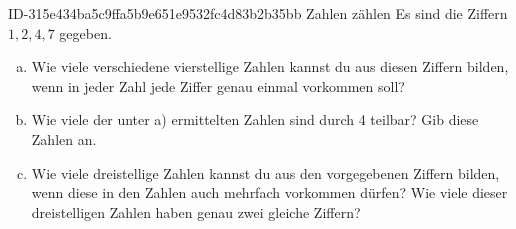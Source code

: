 \begin{exercise}
      {ID-315e434ba5c9ffa5b9e651e9532fc4d83b2b35bb}
      {Zahlen zählen}
  \ifproblem\problem
    Es sind die Ziffern $1,2,4,7$ gegeben.
    \begin{enumerate}[a)]
      \item Wie viele verschiedene vierstellige Zahlen kannst du aus diesen
            Ziffern bilden, wenn in jeder Zahl jede Ziffer genau einmal vorkommen
            soll?
      \item Wie viele der unter a) ermittelten Zahlen sind durch 4 teilbar?
            Gib diese Zahlen an.
      \item Wie viele dreistellige Zahlen kannst du aus den vorgegebenen Ziffern
            bilden, wenn diese in den Zahlen auch mehrfach vorkommen dürfen? Wie
            viele dieser dreistelligen Zahlen haben genau zwei gleiche Ziffern?
    \end{enumerate}
  \fi
\end{exercise}
